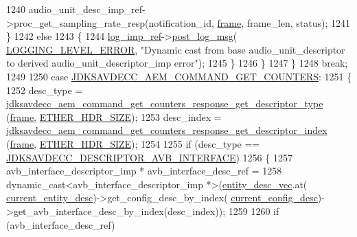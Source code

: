\begin{DoxyCode}
{{1240                 audio\_unit\_desc\_imp\_ref->proc\_get\_sampling\_rate\_resp(notification\_id, 
      \hyperlink{gst__avb__playbin_8c_ac8e710e0b5e994c0545d75d69868c6f0}{frame}, frame\_len, status);
1241             \}
1242             \textcolor{keywordflow}{else}
1243             \{
1244                 \hyperlink{namespaceavdecc__lib_acbe3e2a96ae6524943ca532c87a28529}{log\_imp\_ref}->\hyperlink{classavdecc__lib_1_1log_a68139a6297697e4ccebf36ccfd02e44a}{post\_log\_msg}(
      \hyperlink{namespaceavdecc__lib_a501055c431e6872ef46f252ad13f85cdaf2c4481208273451a6f5c7bb9770ec8a}{LOGGING\_LEVEL\_ERROR}, \textcolor{stringliteral}{"Dynamic cast from base audio\_unit\_descriptor to derived
       audio\_unit\_descriptor\_imp error"});
1245             \}
1246         \}
1247     \}
1248     \textcolor{keywordflow}{break};
1249 
1250     \textcolor{keywordflow}{case} \hyperlink{group__command_ga1cce6a5b14c1a00d2491799265ebfeb6}{JDKSAVDECC\_AEM\_COMMAND\_GET\_COUNTERS}:
1251     \{
1252         desc\_type = 
      \hyperlink{group__command__get__counters__response_gaeb2014fe7143c09e4d7dd849dde4881f}{jdksavdecc\_aem\_command\_get\_counters\_response\_get\_descriptor\_type}
      (\hyperlink{gst__avb__playbin_8c_ac8e710e0b5e994c0545d75d69868c6f0}{frame}, \hyperlink{namespaceavdecc__lib_a6c827b1a0d973e18119c5e3da518e65ca9512ad9b34302ba7048d88197e0a2dc0}{ETHER\_HDR\_SIZE});
1253         desc\_index = 
      \hyperlink{group__command__get__counters__response_gaa74bdfb514c2df95488fd804f59113e5}{jdksavdecc\_aem\_command\_get\_counters\_response\_get\_descriptor\_index}
      (\hyperlink{gst__avb__playbin_8c_ac8e710e0b5e994c0545d75d69868c6f0}{frame}, \hyperlink{namespaceavdecc__lib_a6c827b1a0d973e18119c5e3da518e65ca9512ad9b34302ba7048d88197e0a2dc0}{ETHER\_HDR\_SIZE});
1254 
1255         \textcolor{keywordflow}{if} (desc\_type == \hyperlink{group__descriptor_ga8188eeefbd66dd49e6cf72abb5e1d11e}{JDKSAVDECC\_DESCRIPTOR\_AVB\_INTERFACE})
1256         \{
1257             avb\_interface\_descriptor\_imp * avb\_interface\_desc\_ref =
1258                 \textcolor{keyword}{dynamic\_cast<}avb\_interface\_descriptor\_imp *\textcolor{keyword}{>}(\hyperlink{classavdecc__lib_1_1end__station__imp_a72edab41bc56e3c1757944a7df188a3d}{entity\_desc\_vec}.at(
      \hyperlink{classavdecc__lib_1_1end__station__imp_afd78c89df26ba7641e1adb764c0e827d}{current\_entity\_desc})->get\_config\_desc\_by\_index(
      \hyperlink{classavdecc__lib_1_1end__station__imp_a60b1af40d35e8a86b0082c54ab6cb6a8}{current\_config\_desc})->get\_avb\_interface\_desc\_by\_index(desc\_index));
1259 
1260             \textcolor{keywordflow}{if} (avb\_interface\_desc\_ref)
}}
\end{DoxyCode}
